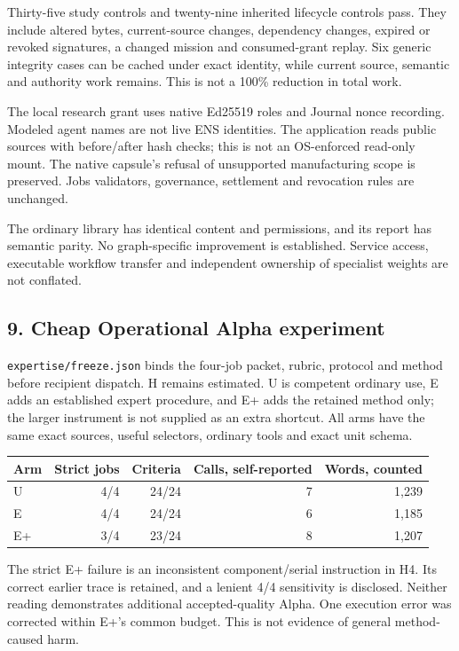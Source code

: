 \documentclass[
  10pt,
]{article}
\let\OriginalSubsection\subsection
\renewcommand{\subsection}{\needspace{6\baselineskip}\OriginalSubsection}
\begin{document}
Thirty-five study controls and twenty-nine inherited lifecycle controls
pass. They include altered bytes, current-source changes, dependency
changes, expired or revoked signatures, a changed mission and
consumed-grant replay. Six generic integrity cases can be cached under
exact identity, while current source, semantic and authority work
remains. This is not a 100\% reduction in total work.

The local research grant uses native Ed25519 roles and Journal nonce
recording. Modeled agent names are not live ENS identities. The
application reads public sources with before/after hash checks; this is
not an OS-enforced read-only mount. The native capsule's refusal of
unsupported manufacturing scope is preserved. Jobs validators,
governance, settlement and revocation rules are unchanged.

The ordinary library has identical content and permissions, and its
report has semantic parity. No graph-specific improvement is
established. Service access, executable workflow transfer and
independent ownership of specialist weights are not conflated.

\hypertarget{cheap-operational-alpha-experiment}{%
\subsection{9. Cheap Operational Alpha
experiment}\label{cheap-operational-alpha-experiment}}

\texttt{expertise/\allowbreak{}freeze.\allowbreak{}json} binds the four-job packet, rubric,
protocol and method before recipient dispatch. H remains estimated. U is
competent ordinary use, E adds an established expert procedure, and E+
adds the retained method only; the larger instrument is not supplied as
an extra shortcut. All arms have the same exact sources, useful
selectors, ordinary tools and exact unit schema.

\begin{longtable}[]{@{}lrrrr@{}}
\toprule\noalign{}
Arm & Strict jobs & Criteria & Calls, self-reported & Words, counted \\
\midrule\noalign{}
\endhead
\bottomrule\noalign{}
\endlastfoot
U & 4/4 & 24/24 & 7 & 1,239 \\
E & 4/4 & 24/24 & 6 & 1,185 \\
E+ & 3/4 & 23/24 & 8 & 1,207 \\
\end{longtable}

The strict E+ failure is an inconsistent component/serial instruction in
H4. Its correct earlier trace is retained, and a lenient 4/4 sensitivity
is disclosed. Neither reading demonstrates additional accepted-quality
Alpha. One execution error was corrected within E+'s common budget. This
is not evidence of general method-caused harm.
\end{document}
